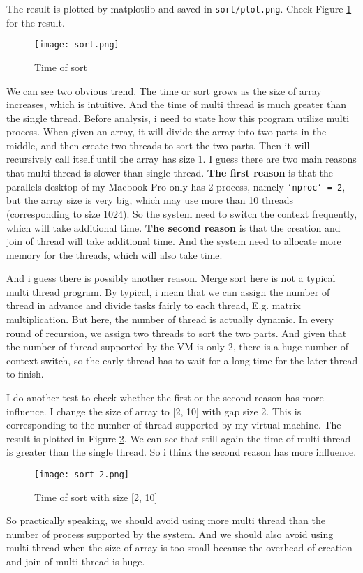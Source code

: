 The result is plotted by matplotlib and saved in \texttt{sort/plot.png}. Check Figure \ref{fig:sort} for the result.
\begin{figure}[!h]
    \centering
    \texttt{[image: sort.png]}
    \caption{Time of sort}
    \label{fig:sort}
\end{figure}

We can see two obvious trend. The time or sort grows as the size of array increases, which is intuitive.
And the time of multi thread is much greater than the single thread. 
Before analysis, i need to state how this program utilize multi process. 
When given an array, it will divide the array into two parts in the middle, and then create two threads to sort the two parts. Then it will recursively call itself until the array has size 1.
I guess there are two main reasons that multi thread is slower than single thread.
\textbf{The first reason} is that the parallels desktop of my Macbook Pro only has 2 process, namely \texttt{`nproc` = 2}, but the array size is very big, which may 
use more than 10 threads (corresponding to size 1024). So the system need to switch the context frequently, which will take additional time.
\textbf{The second reason} is that the creation and join of thread will take additional time. And the system need to allocate more memory for the threads, which will also take time.

And i guess there is possibly another reason. Merge sort here is not a typical multi thread program. By typical, i mean that we can assign the number
of thread in advance and divide tasks fairly to each thread, E.g. matrix multiplication. But here, the number of thread is actually dynamic. In every round
of recursion, we assign two threads to sort the two parts. And given that the number of thread supported by the VM is only 2, there is a huge number of 
context switch, so the early thread has to 
wait for a long time for the later thread to finish. 

I do another test to check whether the first or the second reason has more influence. I change the size of array to [2, 10] with gap size 2. This is corresponding to the number of thread supported by
my virtual machine. The result is plotted in Figure \ref{fig:sort2}. We can see that still again the time of multi thread is greater than the single thread. So i think the second reason has more influence.

\begin{figure}[!h]
    \centering
    \texttt{[image: sort\_2.png]}
    \caption{Time of sort with size [2, 10]}
    \label{fig:sort2}
\end{figure}

So practically speaking, we should avoid using more multi thread than the number of process supported by the system. And we should also avoid using multi thread when the size of array is too small
 because the overhead of creation and join of multi thread is huge.